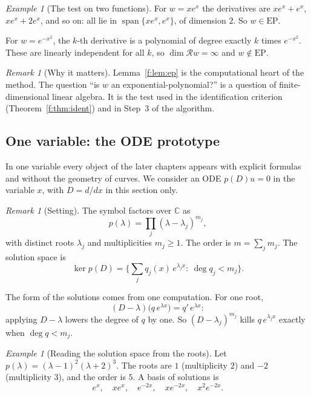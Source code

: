 \documentclass[11pt]{article}
\theoremstyle{plain}
\theoremstyle{definition}
\theoremstyle{remark}
\newtheorem{remark}[theorem]{Remark}
\newtheorem{example}[theorem]{Example}
\newcommand{\C}{\mathbb{C}}
\newcommand{\ring}{\mathcal{R}}            %
\DeclareMathOperator{\spn}{span}
\newcommand{\EP}{\mathrm{EP}}               %
\DeclareMathOperator{\dimc}{dim}
\newenvironment{takeaway}{\begin{remark}[Why it matters]}{\end{remark}}
\newenvironment{notebox}[1]{\begin{remark}[#1]}{\end{remark}}
\begin{document}
\begin{example}[{The test on two functions}]
For $w=xe^{x}$ the derivatives are $xe^x+e^x$, $xe^x+2e^x$, and so on: all lie in $\spn\{xe^x,e^x\}$, of dimension $2$. So $w\in\EP$.

For $w=e^{-x^2}$, the $k$-th derivative is a polynomial of degree exactly $k$ times $e^{-x^2}$. These are linearly independent for all $k$, so $\dimc\ring w=\infty$ and $w\notin\EP$.
\end{example}

\begin{takeaway}
Lemma~\ref{f:lem:ep} is the computational heart of the method. The question ``is $w$ an exponential-polynomial?'' is a question of finite-dimensional linear algebra. It is the test used in the identification criterion (Theorem~\ref{f:thm:ident}) and in Step~3 of the algorithm.
\end{takeaway}

\subsection{One variable: the ODE prototype}\label{sec:ode}

In one variable every object of the later chapters appears with explicit formulas and without the geometry of curves. We consider an ODE $p(D)u=0$ in the variable $x$, with $D=d/dx$ in this section only.

\begin{notebox}{Setting}
The symbol factors over $\C$ as
\[
p(\lambda)=\prod_j(\lambda-\lambda_j)^{m_j},
\]
with distinct roots $\lambda_j$ and multiplicities $m_j\ge1$. The order is $m=\sum_jm_j$. The solution space is
\[
\ker p(D)=\Big\{\sum_jq_j(x)\,e^{\lambda_jx}:\ \deg q_j<m_j\Big\}.
\]
\end{notebox}

The form of the solutions comes from one computation. For one root,
\[
(D-\lambda)\big(q\,e^{\lambda x}\big)=q'\,e^{\lambda x}:
\]
applying $D-\lambda$ lowers the degree of $q$ by one. So $(D-\lambda_j)^{m_j}$ kills $q\,e^{\lambda_jx}$ exactly when $\deg q<m_j$.

\begin{example}[{Reading the solution space from the roots}]
Let $p(\lambda)=(\lambda-1)^2(\lambda+2)^3$. The roots are $1$ (multiplicity $2$) and $-2$ (multiplicity $3$), and the order is $5$. A basis of solutions is
\[
e^{x},\quad xe^{x},\quad e^{-2x},\quad xe^{-2x},\quad x^2e^{-2x}.
\]
\end{example}
\end{document}

